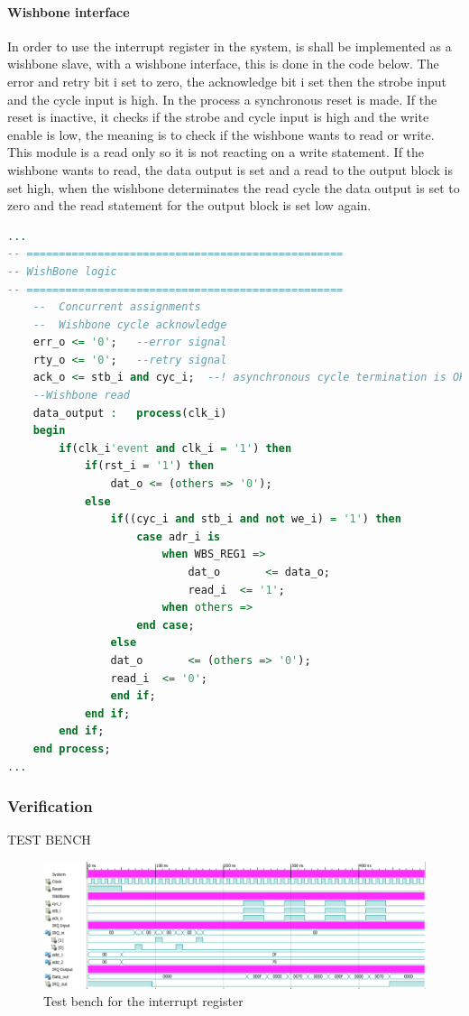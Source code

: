 \paragraph{Wishbone interface}
In order to use the interrupt register in the system, is shall be implemented as a wishbone slave, with a wishbone interface, this is done in the code below. The error and retry bit i set to zero, the acknowledge bit i set then the strobe input and the cycle input is high. In the process a synchronous reset is made. If the reset is inactive, it checks if the strobe and cycle input is high and the write enable is low, the meaning is to check if the wishbone wants to read or write. This module is a read only so it is not reacting on a write statement. If the wishbone wants to read, the data output is set and a read to the output block is set high, when the wishbone determinates the read cycle the data output is set to zero and the read statement for the output block is set low again.
\begin{lstlisting}[language=VHDL]
...
-- =================================================
-- WishBone logic
-- =================================================
	--  Concurrent assignments
	--	Wishbone cycle acknowledge
	err_o <= '0';	--error signal
	rty_o <= '0';	--retry signal
	ack_o <= stb_i and cyc_i;  --! asynchronous cycle termination is OK here.
	--Wishbone read
	data_output	:	process(clk_i)
	begin
		if(clk_i'event and clk_i = '1') then
			if(rst_i = '1') then
				dat_o <= (others => '0');
			else
				if((cyc_i and stb_i and not we_i) = '1') then
					case adr_i is
						when WBS_REG1 =>
							dat_o		<= data_o;
							read_i	<= '1';
						when others =>
					end case;
				else
				dat_o		<= (others => '0');
				read_i	<= '0';
				end if;
			end if;
		end if;			
	end process;
...
\end{lstlisting}
%
%
\subsubsection{Verification}
TEST BENCH
\begin{figure}[H]
	\begin{centering}
		\includegraphics[width=1.0\textwidth]{images/tb5_irq_reg_testbench.png}
		\caption{Test bench for the interrupt register}
	\end{centering}
\end{figure}
%
